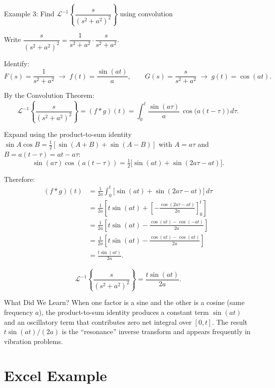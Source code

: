 \documentclass[12pt,a4paper]{article}
\begin{document}
\begin{infobox}{Example 3: Find $\mathcal{L}^{-1}\!\left\{\dfrac{s}{(s^2+a^2)^2}\right\}$ using convolution}

Write $\dfrac{s}{(s^2+a^2)^2} = \dfrac{1}{s^2+a^2}\cdot\dfrac{s}{s^2+a^2}$.

Identify:
\[
  F(s) = \frac{1}{s^2+a^2} \;\longrightarrow\; f(t) = \frac{\sin(at)}{a},
  \qquad
  G(s) = \frac{s}{s^2+a^2} \;\longrightarrow\; g(t) = \cos(at).
\]

By the Convolution Theorem:
\[
  \mathcal{L}^{-1}\!\left\{\frac{s}{(s^2+a^2)^2}\right\}
    = (f * g)(t)
    = \int_0^t \frac{\sin(a\tau)}{a}\,\cos\bigl(a(t-\tau)\bigr)\,d\tau.
\]

Expand using the product-to-sum identity
$\sin A \cos B = \tfrac{1}{2}[\sin(A+B) + \sin(A-B)]$
with $A = a\tau$ and $B = a(t-\tau) = at - a\tau$:
\[
  \sin(a\tau)\cos(a(t-\tau))
    = \tfrac{1}{2}\bigl[\sin(at) + \sin(2a\tau - at)\bigr].
\]

Therefore:
\begin{align*}
(f*g)(t)
  &= \frac{1}{2a}\int_0^t \bigl[\sin(at) + \sin(2a\tau - at)\bigr]\,d\tau \\
  &= \frac{1}{2a}\left[t\sin(at) + \left[-\frac{\cos(2a\tau-at)}{2a}\right]_0^t\right] \\
  &= \frac{1}{2a}\left[t\sin(at) - \frac{\cos(at) - \cos(-at)}{2a}\right] \\
  &= \frac{1}{2a}\left[t\sin(at) - \frac{\cos(at)-\cos(at)}{2a}\right] \\
  &= \frac{t\sin(at)}{2a}.
\end{align*}

\[
  \boxed{\mathcal{L}^{-1}\!\left\{\frac{s}{(s^2+a^2)^2}\right\}
    = \frac{t\sin(at)}{2a}.}
\]
\end{infobox}

\begin{learnbox}{What Did We Learn?}
When one factor is a sine and the other is a cosine (same frequency $a$), the
product-to-sum identity produces a constant term $\sin(at)$ and an oscillatory
term that contributes zero net integral over $[0,t]$. The result $t\sin(at)/(2a)$
is the ``resonance'' inverse transform and appears frequently in vibration
problems.
\end{learnbox}

\section{Excel Example }
\end{document}

